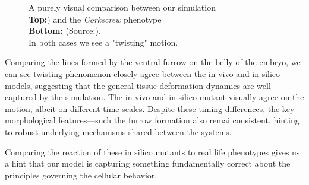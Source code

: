  
\begin{figure}[H]
    \centering
    \caption{A purely visual comparison between our simulation \\
    \textbf{Top:}) and the \textit{Corkscrew} phenotype \\
    \textbf{Bottom:}   (Source:).\\ In both cases we see a "twisting" motion.}
    \label{fig:corkscrew-comparison}
\end{figure}

Comparing the lines formed by the ventral furrow on the belly of the embryo, we can see twisting phenomenon closely agree between the in vivo and in silico models, suggesting that the general tissue deformation dynamics are well captured by the simulation. The in vivo and in silico mutant visually agree on the motion, albeit on different time scales. Despite these timing differences, the key morphological features—such the furrow formation also remai consistent, hinting to robust underlying mechanisms shared between the systems.


Comparing the reaction of these in silico mutants to real life phenotypes gives us a hint that our model is capturing something fundamentally correct about the principles governing the cellular behavior. 



